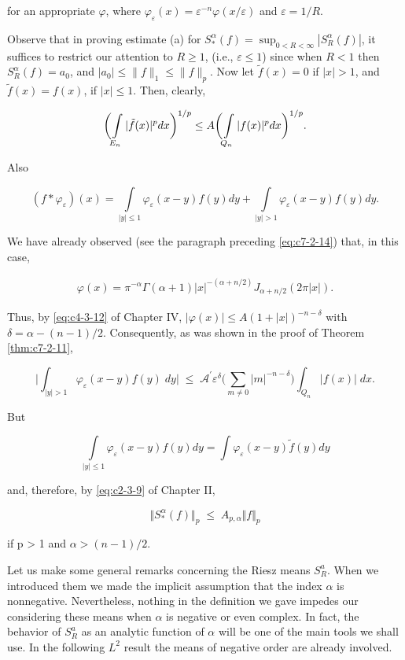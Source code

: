 for an appropriate $\varphi$, where $\varphi_{\varepsilon}(x) = \varepsilon^{-n}\varphi(x/\varepsilon)$ and $\varepsilon = 1/R$.

Observe that in proving estimate (a) for $S_{*}^{\alpha}(f) = \sup_{0 < R < \infty} |S_{R}^{\alpha}(f)|$, it suffices to restrict our attention to $R \geq 1$, (i.e., $\varepsilon \leq 1$) since when $R < 1$ then $S_{R}^{\alpha}(f) = a_0$, and $|a_0| \leq \|f\|_1 \leq \|f\|_p$. Now let $\tilde{f}(x) = 0$ if $|x| > 1$, and $\tilde{f}(x) = f(x)$, if $|x| \leq 1$. Then, clearly,

\[
\biggl(\intop_{E_{n}}|\tilde{f}(x)|^{p}d x\biggr)^{1/p}\leq A\biggl(\intop_{Q_{n}}|f(x)|^{p}d x\biggr)^{1/p}.
\]

Also

\[
(f*\varphi_{\varepsilon})(x)=\int\limits_{|y|\leq1}\varphi_{\varepsilon}(x-y)f(y)d y+\int\limits_{|y|>1}\varphi_{\varepsilon}(x-y)f(y)d y.
\]

We have already observed (see the paragraph preceding \eqref{eq:c7-2-14}) that, in this case,

\[
\begin{array}{r}{\varphi(x)=\pi^{-\alpha}\Gamma(\alpha+1)|x|^{-(\alpha+n/2)}J_{\alpha+n/2}(2\pi|x|).}\end{array}
\]

Thus, by \eqref{eq:c4-3-12} of Chapter IV, $|\varphi(x)| \leq A(1 + |x|)^{-n-\delta}$ with $\delta = \alpha - (n-1)/2$. Consequently, as was shown in the proof of Theorem \eqref{thm:c7-2-11},

\[
\bigg|\int_{|y|>1}\varphi_{\varepsilon}(x-y)f(y)\;d y\bigg|\;\leq\;\mathcal A^{\prime}\varepsilon^{\delta}\bigg(\sum_{m\neq0}|m|^{-n-\delta}\bigg)\int_{Q_{n}}|f(x)|\;d x.
\]

But

\[
\int\limits_{|y|\leq1}\varphi_{\varepsilon}(x-y)f(y)d y=\int\varphi_{\varepsilon}(x-y)\tilde{f}(y)d y
\]

and, therefore, by \eqref{eq:c2-3-9} of Chapter II,

\[
\Vert S_{*}^{\alpha}(f)\Vert_{p}\;\leq\;A_{p,\alpha}\Vert f\Vert_{p}
\]

if p > 1 and $\alpha > (n - 1)/2$.

Let us make some general remarks concerning the Riesz means $S_R^a$. When we introduced them we made the implicit assumption that the index $\alpha$ is nonnegative. Nevertheless, nothing in the definition we gave impedes our considering these means when $\alpha$ is negative or even complex. In fact, the behavior of $S_R^a$ as an analytic function of $\alpha$ will be one of the main tools we shall use. In the following $L^2$ result the means of negative order are already involved.


